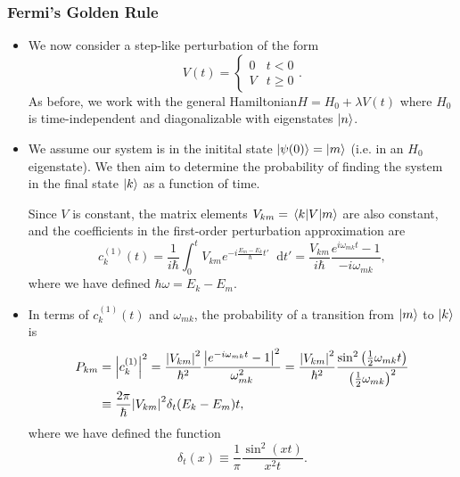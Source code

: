 \documentclass[11pt, a4paper]{article}
\newcommand{\diff}{\mathop{}\!\mathrm{d}} %
\newcommand{\Ham}{Hamiltonian\xspace}
\begin{document}
\subsubsection{Fermi's Golden Rule}
\begin{itemize}
    \item We now consider a step-like perturbation of the form
    \begin{equation*}
        V(t) = 
        \begin{cases}
            0 & t < 0\\
            V & t \geq 0
        \end{cases}.
    \end{equation*}
    As before, we work with the general \Ham $ H = H_{0} + \lambda V(t) $ where $ H_{0} $ is time-independent and diagonalizable with eigenstates $ \ket{n} $.

    \item We assume our system is in the initital state $ \ket{\psi(0)} = \ket{m} $ (i.e. in an $ H_{0} $ eigenstate). We then aim to determine the probability of finding the system in the final state $ \ket{k} $ as a function of time.

    Since $ V $ is constant, the matrix elements $ V_{km} = \mel{k}{V}{m} $ are also constant, and the coefficients in the first-order perturbation approximation are
    \begin{equation*}
        c_{k}^{(1)}(t) = \frac{1}{i \hbar} \int_{0}^{t} V_{km}e^{-i \frac{E_{m} - E_{k}}{\hbar}t'} \diff t' = \frac{V_{km}}{i \hbar} \frac{e^{i\omega_{mk}t} - 1}{- i \omega_{mk}},
    \end{equation*}
    where we have defined $ \hbar \omega = E_{k} - E_{m} $. 

    \item In terms of $ c_{k}^{(1)}(t) $ and $ \omega_{mk} $, the probability of a transition from $ \ket{m} $ to $ \ket{k} $ is
    \begin{align*}
        P_{km} &= \abs{c_{k}^{(1)}}^{2} = \frac{\abs{V_{km}}^{2}}{\hbar^{2}} \frac{\abs{e^{-i\omega_{mk}t} - 1}^{2}}{\omega^{2}_{mk}} = \frac{\abs{V_{km}}^{2}}{\hbar^{2}} \frac{\sin^{2}\left( \tfrac{1}{2} \omega_{mk}t \right)}{\left( \tfrac{1}{2}\omega_{mk} \right)^{2}}\\
        & \equiv \frac{2\pi}{\hbar}\abs{V_{km}}^{2} \delta_{t}(E_{k} - E_{m})t,
    \end{align*}
    where we have defined the function
    \begin{equation*}
        \delta_{t}(x) \equiv \frac{1}{\pi} \frac{\sin^{2}(xt)}{x^{2}t}.
    \end{equation*}
    

\end{itemize}
\end{document}
